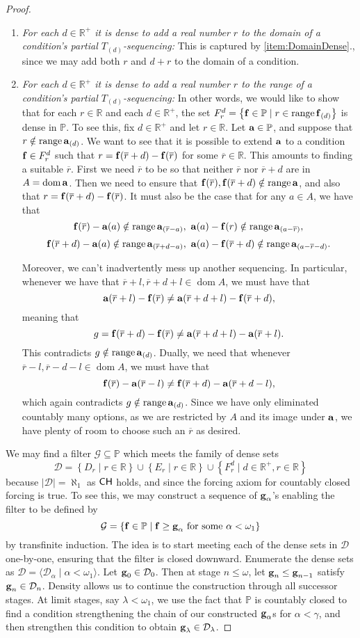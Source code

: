 \documentclass{amsart}
\theoremstyle{definition}
\theoremstyle{remark}
\renewcommand{\P}{\mathbb{P}}
\newcommand{\R}{\mathbb{R}}
\newcommand{\CH}{\textup{\textsf{CH}}}
\DeclareMathOperator{\ran}{range}
\DeclareMathOperator{\dom}{dom}
\newcommand{\st}{\; | \;}
\newcommand{\set}[2]{\left\{#1\st #2 \right\}}
\newcommand{\seq}[2]{\langle #1 \st #2 \rangle}
\renewcommand{\a}{\textup{\textbf{a}}}
\newcommand{\g}{\textup{\textbf{g}}}
\newcommand{\f}{\textup{\textbf{f}}}
\renewcommand{\r}{\overline r}
\begin{document}
\begin{proof}
\begin{enumerate}
	\item \label{item:StepFunctionDomainDense} \emph{For each $d \in \R^+$ it is dense to add a real number $r$ to the domain of a condition's partial $T_{(d)}$-sequencing:} This is captured by \ref{item:DomainDense}., since we may add both $r$ and $d+r$ to the domain of a condition.
	\item \emph{For each $d \in \R^+$ it is dense to add a real number $r$ to the range of a condition's partial $T_{(d)}$-sequencing:} In other words, we would like to show that for each $r \in \R$ and each $d \in \R^+$, the set $F^d_r=\set{\f \in \P}{r \in \ran \f_{(d)}}$ is dense in $\P$. To see this, fix $d \in \R^+$ and let $r \in \R$. Let $\a \in \P$, and suppose that $r \notin \ran\a_{(d)}$. We want to see that it is possible to extend $\a$ to a condition $\f \in F^d_r$ such that $r=\f(\r+d)-\f(\r)$ for some $\r \in \R$. This amounts to finding a suitable $\r$. First we need $\r$ to be so that neither $\r$ nor $\r+d$ are in $A = \dom \a$. Then we need to ensure that $\f(\r), \f(\r+d) \notin \ran \a$, and also that $r=\f(\r+d)-\f(\r)$. 
	It must also be the case that for any $a\in A$, we have that $$\f(\r)-\a(a) \notin \ran \a_{(\r-a)}, \ \a(a)-\f(r) \notin \ran \a_{(a-\r)},$$ $$\f(\r+d) - \a(a) \notin \ran \a_{(\r+d-a)}, \ \a(a) - \f(\r+d) \notin \ran \a_{(a-\r-d)}.$$

Moreover, we can't inadvertently mess up another sequencing. In particular, whenever we have that $\r+l, \r+d+l \in \dom A$, we must have that $$\a(\r+l)-\f(\r)\neq \a(\r+d+l) - \f(\r+d),$$ meaning that $$g= \f(\r+d)-\f(\r) \neq \a(\r+d+l) - \a(\r+l).$$ This contradicts $g \notin \ran \a_{(d)}$. Dually, we need that whenever $\r-l, \r-d-l \in \dom A$, we must have that $$\f(\r)-\a(\r-l) \neq \f(\r+d)-\a(\r+d-l),$$ which again contradicts $g \notin \ran \a_{(d)}$.
Since we have only eliminated countably many options, as we are restricted by $A$ and its image under $\a$, we have plenty of room to choose such an $\r$ as desired.
\end{enumerate}

We may find a filter $\mathcal G\subseteq \P$ which meets the family of dense sets $$\mathcal D = \set{D_r}{r\in \R} \cup \set{E_r}{r \in \R} \cup \set{F^d_r}{d \in \R^+, r \in \R}$$ because $|\mathcal D|=\aleph_1$ as $\CH$ holds, and since the forcing axiom for countably closed forcing is true. To see this, we may construct a sequence of $\g_\alpha$'s enabling the filter to be defined by $$\mathcal G=\set{\f \in \P}{\f \geq \g_\alpha \text{ for some } \alpha<\omega_1}$$ by transfinite induction. The idea is to start meeting each of the dense sets in $\mathcal D$ one-by-one, ensuring that the filter is closed downward. Enumerate the dense sets as $\mathcal D = \seq{\mathcal D_\alpha}{\alpha<\omega_1}$. Let $\g_0 \in \mathcal D_0$. Then at stage $n \leq \omega$, let $\g_n \leq \g_{n-1}$ satisfy $\g_n \in \mathcal D_n$. Density allows us to continue the construction through all successor stages. At limit stages, say $\lambda <\omega_1$, we use the fact that $\P$ is countably closed to find a condition strengthening the chain of our constructed $\g_\alpha$s for $\alpha<\gamma$, and then strengthen this condition to obtain $\g_\lambda \in \mathcal D_\lambda$.


\end{proof}
\end{document}
